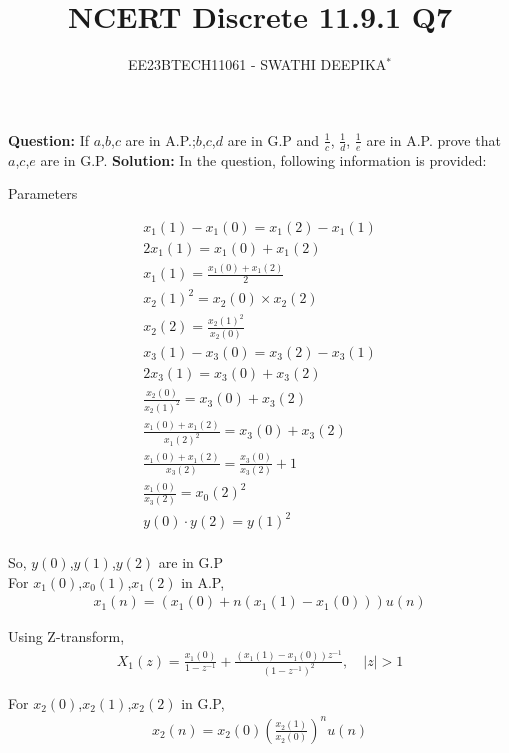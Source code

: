 \documentclass[journal,12pt,twocolumn]{IEEEtran}
\title{
	
\title{NCERT Discrete 11.9.1 Q7}
\author{EE23BTECH11061 - SWATHI DEEPIKA$^{*}$%
}


}
\providecommand{\brak}[1]{\ensuremath{\left(#1\right)}}
\theoremstyle{remark}
\newcommand{\solution}{\noindent \textbf{Solution: }}
\begin{document}
\maketitle

\textbf{Question:} 
If $a$,$b$,$c$ are in A.P.;$b$,$c$,$d$ are in G.P and $\frac{1}{c}$, $\frac{1}{d}$, $\frac{1}{e}$ are in A.P. prove that $a$,$c$,$e$ are in G.P.
\solution
In the question, following information is provided:
 \begin{table}[h]
 	\centering
 	\resizebox{6 cm}{!}{
 		
 	}
 	\vspace{6 pt}
 	\caption{Parameters}
 	\label{tab:swa_tabel} 
 \end{table}

 
\begin{align}
x_1(1)-x_1(0) = x_1(2)-x_1(1)\\
2x_1(1)=x_1(0)+x_1(2)\\
x_1(1)=\frac{x_1(0)+x_1(2)}{2}\\
x_2(1)^2 = x_2(0)\times x_2(2)\\
x_2(2)= \frac{{x_2(1)}^2}{x_2(0)}\\
x_3(1) - x_3(0) = x_3(2) - x_3(1)\\
2{x_3(1)} = x_3(0) + x_3(2)\\
\frac{x_2(0)}{x_2(1)^2} = x_3(0) + x_3(2)\\
\frac{x_1(0) + x_1(2)}{{x_1(2)}^2} = x_3(0) + x_3(2)\\
\frac{x_1(0)+x_1(2)}{x_3(2)} = \frac{x_3(0)}{x_3(2)} + 1\\
\frac{x_1(0)}{x_3(2)} = {x_0(2)}^2\\
y(0) \cdot y(2) = {y(1)}^2\\
\end{align}

So, $y(0)$,$y(1)$,$y(2)$ are in G.P\\


For $x_1(0)$,$x_0(1)$,$x_1(2)$ in A.P,
\begin{align}
x_1(n) = (x_1(0) + n(x_1(1)-x_1(0)))u(n)
\end{align}

Using Z-transform, 
\begin{align}
X_1(z) = \frac{x_1(0)}{1-z^{-1}} + \frac{(x_1(1)-x_1(0))z^{-1}}{(1-z^{-1})^2} ,
\quad |z| > 1
\end{align}

For $x_2(0)$,$x_2(1)$,$x_2(2)$ in G.P,
\begin{align}
x_2(n) = x_2(0)\brak{\frac{x_2(1)}{x_2(0)}}^n u(n)
\end{align}
\end{document}
